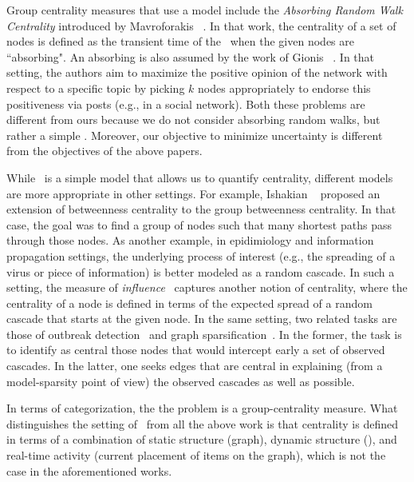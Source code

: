 Group centrality measures that use a {\markovchain} model 
include the {\it Absorbing Random Walk Centrality} 
introduced by Mavroforakis {\etal}~\cite{Mavroforakis:2015}. 
In that work, the centrality of a set of nodes is defined
as the transient time of the \markovchain\ when 
the given nodes are ``absorbing". 
An absorbing {\markovchain} is also assumed by the work of Gionis {\etal}~\cite{gionis13maximizing}. 
In that setting, the authors aim to maximize the positive
opinion of the network with respect to a specific topic by picking $k$ nodes appropriately to endorse this positiveness via posts (e.g., in a social network).
Both these problems are different from ours because we do not consider 
absorbing random walks, but rather a simple {\markovchain}. 
Moreover, our objective to minimize uncertainty is different from the 
objectives of the above papers. 


While \markovchain\ is a simple model that allows us to quantify 
centrality, different models are more appropriate
in other settings.
For example, Ishakian {\etal}~\cite{ishakian12framework} proposed an extension
of betweenness centrality to the group betweenness centrality. In that case, the goal
was to find a group of nodes such that many shortest paths pass through those nodes.
As another example, in epidimiology and information propagation
settings, the underlying process of interest (e.g., the spreading of a virus
or piece of information) is better modeled
as a random cascade.
In such a setting, the measure of 
{\it influence}~\cite{borgs2014maximizing, galhotra2015asim, goyal2011simpath,
Kempe:2003, ohsaka2014fast, Tang:2014} captures another notion of centrality, where
the centrality of a node is defined in
terms of the expected spread of a random cascade that starts at the
given node. In the same setting, two related tasks are those of outbreak 
detection~\cite{leskovec2007cost} and graph 
sparsification~\cite{Mathioudakis:2011}. In the former,
the task is to identify as central those nodes that would intercept 
early a set of observed cascades. In the latter, one seeks edges
that are central in explaining (from a model-sparsity point of view)
the observed cascades as well as possible.

In terms of categorization, the  the {\mcproblem} problem
is a group-centrality measure.
What distinguishes the setting of \mcproblem\
from all the above work is that 
centrality is defined in terms of a combination
of static structure (graph), 
dynamic structure (\markovchain), and real-time activity 
(current placement of items on the graph),  which is not the case in
the aforementioned works.

